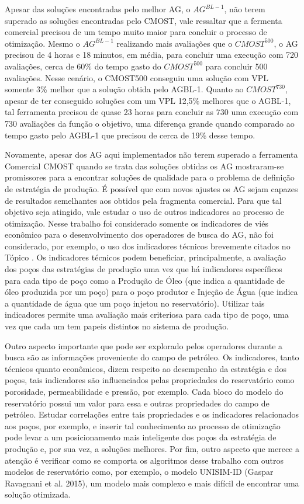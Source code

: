 Apesar das soluções encontradas pelo melhor AG, o $AG^{BL-1}$, não terem superado as soluções encontradas pelo CMOST, vale ressaltar que a fermenta comercial precisou de um tempo muito maior para concluir o processo de otimização. Mesmo o $AG^{BL-1}$ realizando mais avaliações que o $CMOST^{500}$, o AG precisou de 4 horas e 18 minutos, em média, para concluir uma execução com 720 avaliações, cerca de 60\% do tempo gasto do $CMOST^{500}$ para concluir 500 avaliações. Nesse cenário, o CMOST500 conseguiu uma solução com VPL somente 3\% melhor que a solução obtida pelo AGBL-1. Quanto ao $CMOST^{730}$, apesar de ter conseguido soluções com um VPL 12,5\% melhores que o AGBL-1, tal ferramenta precisou de quase 23 horas para concluir as 730 uma execução com 730 avaliações da função o objetivo, uma diferença grande quando comparado ao tempo gasto pelo AGBL-1 que precisou de cerca de 19\% desse tempo.

Novamente, apesar dos AG aqui implementados não terem superado a ferramenta Comercial CMOST quando se trata das soluções obtidas os AG mostraram-se promissores para a encontrar soluções de qualidade para o problema de definição de estratégia de produção. É possível que com novos ajustes os AG sejam capazes de resultados semelhantes aos obtidos pela fragmenta comercial.  Para que tal objetivo seja atingido, vale estudar o uso de outros indicadores ao processo de otimização. Nesse trabalho foi considerado somente os indicadores de viés econômico para o desenvolvimento dos operadores de busca do AG, não foi considerado, por exemplo, o uso dos indicadores técnicos brevemente citados no Tópico . Os indicadores técnicos podem beneficiar, principalmente, a avaliação dos poços das estratégias de produção uma vez que há indicadores específicos para cada tipo de poço como a Produção de Óleo (que indica a quantidade de óleo produzida por um poço) para o poço produtor e Injeção de Água (que indica a quantidade de água que um poço injetou no reservatório). Utilizar tais indicadores permite uma avaliação mais criteriosa para cada tipo de poço, uma vez que cada um tem papeis distintos no sistema de produção. 

Outro aspecto importante que pode ser explorado pelos operadores durante a busca são as informações proveniente do campo de petróleo. Os indicadores, tanto técnicos quanto econômicos, dizem respeito ao desempenho da estratégia e dos poços, tais indicadores são influenciados pelas propriedades do reservatório como porosidade, permeabilidade e pressão, por exemplo. Cada bloco do modelo do reservatório possui um valor para essa e outras propriedades do campo de petróleo. Estudar correlações entre tais propriedades e os indicadores relacionados aos poços, por exemplo, e inserir tal conhecimento ao processo de otimização pode levar a um posicionamento mais inteligente dos poços da estratégia de produção e, por sua vez, a soluções melhores. Por fim, outro aspecto que merece a atenção é verificar como se comporta os algoritmos desse trabalho com outros modelos de reservatório como, por exemplo, o modelo UNISIM-ID (Gaspar Ravagnani et al. 2015), um modelo mais complexo e mais difícil de encontrar uma solução otimizada.
